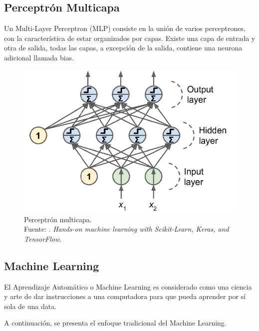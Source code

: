 \subsection{Perceptrón Multicapa}
Un Multi-Layer Perceptron (MLP) consiste en la unión de varios perceptrones, con la característica de estar organizados por capas. Existe una capa de entrada y otra de salida, todas las capas, a excepción de la salida, contiene una neurona adicional llamada bias. \parencite{bk_geron2022handml}

\begin{figure}[H]
	\begin{center}
		\includegraphics[width=1.00\textwidth]{2/figures/mlp.png}
		\caption[Perceptrón multicapa]{Perceptrón multicapa. \\
		Fuente: \cite{bk_geron2022handml}. \textit{Hands-on machine learning with Scikit-Learn, Keras, and TensorFlow}.}
		\label{2:fig208}
	\end{center}
\end{figure}


\subsection{Machine Learning}
El Aprendizaje Automático o Machine Learning es considerado como una ciencia y arte de dar instrucciones a una computadora para que pueda aprender por sí sola de una data. \parencite{bk_geron2022handml}

A continuación, se presenta el enfoque tradicional del Machine Learning.

